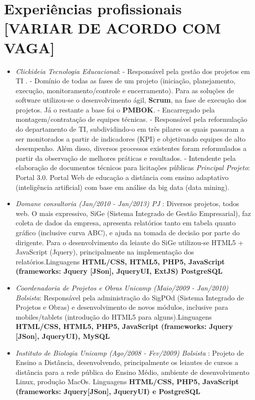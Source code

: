\documentclass[a4paper,10pt]{article}
\begin{document}
\section{Experiências profissionais [VARIAR DE ACORDO COM VAGA]}
\begin{itemize}

\item \emph{Clickideia Tecnologia Educacional}: 
  \subitem - Responsável pela gestão dos projetos em TI .
  \subitem - Domínio de todas as fases de um projeto (iniciação, planejamento, execução, monitoramento/controle e encerramento). Para as soluções de software utilizou-se o desenvolvimento ágil, \textbf{Scrum}, na fase de execução dos projetos. Já o restante a base foi o \textbf{PMBOK}.
  \subitem - Encarregado pela montagem/contratação de equipes técnicas.
  \subitem - Responsável pela reformulação do departamento de TI, subdividindo-o em três pilares os quais passaram a ser monitorados a partir de indicadores (KPI) e objetivando equipes de alto desempenho. Além disso, diversos processos existentes foram reformulados a partir da observação de melhores práticas e resultados.
  \subitem - Intendente pela elaboração de documentos técnicos para licitações públicas
  \subitem \emph{Principal Projeto}: Portal 3.0. Portal Web de educação a distância com ensino adaptativo (inteligência artificial) com base em análise da big data (data mining).
  
\item \emph{Domane consultoria (Jan/2010 - Jan/2013) PJ }: Diversos projetos, todos web. O mais expressivo, SiGe (Sistema Integrado de Gestão Empresarial), faz coleta de dados da empresa, apresenta relatórios tanto em tabela quanto gráfico (inclusive curva ABC), e ajuda na tomada de decisão por parte do dirigente. Para o desenvolvimento da leiaute do SiGe utilizou-se HTML5 + JavaScript (Jquery), principalmente na implementação dos relatórios.Linguagens \textbf{HTML/CSS, HTML5, PHP5, JavaScript (frameworks: Jquery [JSon], JqueryUI, ExtJS) PostgreSQL}
\item \emph{Coordenadoria de Projetos e Obras Unicamp (Maio/2009 - Jan/2010) Bolsista}: Responsável pela administração do SigPOd (Sistema Integrado de Projetos e Obras) e desenvolvimento de novos módulos, inclusive para mobiles/tablets (introdução do HTML5 para alguns).Linguagens \textbf{HTML/CSS, HTML5, PHP5, JavaScript (frameworks: Jquery [JSon], JqueryUI), MySQL}
  
\item \emph{Instituto de Biologia Unicamp (Ago/2008 - Fev/2009) Bolsista }: Projeto de Ensino a Distância, desenvolvendo, principalmente os leiautes de cursos a distância para a rede pública do Ensino Médio, ambiente de desenvolvimento Linux, produção MacOs. Linguagens \textbf{HTML/CSS, PHP5, JavaScript (frameworks: Jquery[JSon], JqueryUI) e PostgreSQL}


\end{itemize}
\end{document}
